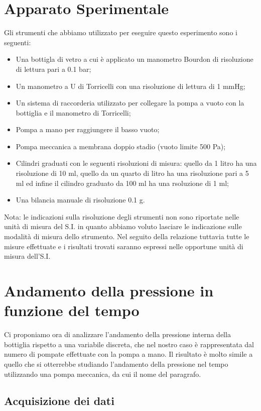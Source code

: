 \section{Apparato Sperimentale}

Gli strumenti che abbiamo utilizzato per eseguire questo esperimento sono i seguenti:
\begin{itemize}
	\item{Una bottigla di vetro a cui è applicato un manometro Bourdon di risoluzione di lettura pari a 0.1 bar;}
	\item{Un manometro a U di Torricelli con una risoluzione di lettura di 1 mmHg;}
	\item{Un sistema di raccorderia utilizzato per collegare la pompa a vuoto con la bottiglia e il manometro di Torricelli;}
	\item{Pompa a mano per raggiungere il basso vuoto;}
	\item{Pompa meccanica a membrana doppio stadio (vuoto limite 500 Pa);}
	\item{Cilindri graduati con le seguenti risoluzioni di misura: quello da 1 litro ha una risoluzione di 10 ml, quello da un quarto di litro ha una risoluzione pari a 5 ml ed infine il cilindro graduato da 100 ml ha una rsoluzione di 1 ml;}
	\item{Una bilancia manuale di risoluzione 0.1 g.}
\end{itemize}
%
Nota: %
le indicazioni sulla risoluzione degli strumenti non sono riportate nelle unità di misura del S.I. %
in quanto abbiamo voluto lasciare le indicazione sulle modalità di misura dello strumento. Nel seguito della relazione tuttavia tutte le misure effettuate e i risultati trovati saranno espressi nelle opportune unità di misura dell'S.I.

\section{Andamento della pressione in funzione del tempo}

Ci proponiamo ora di analizzare l'andamento della pressione interna della bottiglia rispetto a una
variabile discreta, che nel nostro caso è rappresentata dal numero di pompate effettuate
con la pompa a mano. Il risultato è molto simile a quello che si otterrebbe studiando l'andamento
della pressione nel tempo utilizzando una pompa meccanica, da cui il nome del paragrafo.

\subsection{Acquisizione dei dati}

